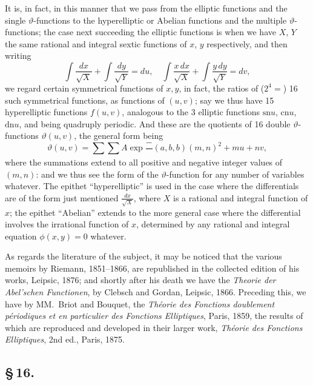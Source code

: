 \documentclass[11pt,a4paper]{book}
\providecommand{\sn}{\mathrm{sn}}
\providecommand{\cn}{\mathrm{cn}}
\providecommand{\dn}{\mathrm{dn}}
\begin{document}
It is, in fact, in this manner that we pass from the elliptic functions and the single $\vartheta$-functions to the hyperelliptic or Abelian functions and the multiple $\vartheta$-functions; the case next succeeding the elliptic functions is when we have $X$, $Y$ the same rational and integral sextic functions of $x$, $y$ respectively, and then writing
\[
\int\frac{dx}{\sqrt{X}} + \int\frac{dy}{\sqrt{Y}} = du, \quad
\int\frac{x\,dx}{\sqrt{X}} + \int\frac{y\,dy}{\sqrt{Y}} = dv,
\]
we regard certain symmetrical functions of $x, y$, in fact, the ratios of ($2^{4} =$) 16 such symmetrical functions, as functions of $(u, v)$; say we thus have 15 hyperelliptic functions $f(u, v)$, analogous to the 3 elliptic functions $\sn u$, $\cn u$, $\dn u$, and being quadruply periodic. And these are the quotients of 16 double $\vartheta$-functions $\vartheta(u, v)$, the general form being
\[
\vartheta(u, v) = \sum\sum A\exp\frac{-}{}(a, b, b)(m, n)^{2} + mu + nv,
\]
where the summations extend to all positive and negative integer values of $(m, n)$: and we thus see the form of the $\vartheta$-function for any number of variables whatever. The epithet ``hyperelliptic'' is used in the case where the differentials are of the form just mentioned $\frac{dx}{\sqrt{X}}$, where $X$ is a rational and integral function of $x$; the epithet ``Abelian'' extends to the more general case where the differential involves the irrational function of $x$, determined by any rational and integral equation $\phi(x, y) = 0$ whatever.

As regards the literature of the subject, it may be noticed that the various memoirs by Riemann, 1851--1866, are republished in the collected edition of his works, Leipsic, 1876; and shortly after his death we have the \textit{Theorie der Abel'schen Functionen}, by Clebsch and Gordan, Leipsic, 1866. Preceding this, we have by MM.\ Briot and Bouquet, the \textit{Th\'{e}orie des Fonctions doublement p\'{e}riodiques et en particulier des Fonctions Elliptiques}, Paris, 1859, the results of which are reproduced and developed in their larger work, \textit{Th\'{e}orie des Fonctions Elliptiques}, 2nd ed., Paris, 1875.

\subsection*{\S\,16.}
\end{document}
